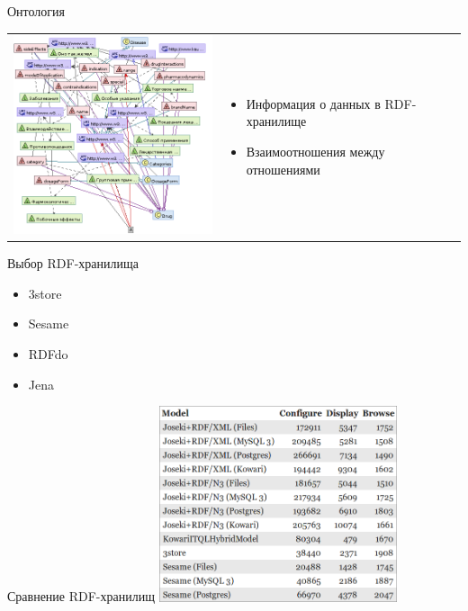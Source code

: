 \documentclass{beamer}
\begin{document}
\begin{frame}[t]{Онтология}

\begin{tabular}{l l}
\begin{minipage}{0.6\textwidth}
\includegraphics[width=70mm]{onto.png}
\end{minipage}
&
\begin{minipage}{0.4\textwidth}
\begin{itemize}
\item Информация о данных в RDF-хранилище
\item Взаимоотношения между отношениями
\end{itemize}
\end{minipage}
\end{tabular}
\end{frame}
\begin{frame}[t]{Выбор RDF-хранилища}
 \begin{itemize}
  \item 3store
  \item Sesame
  \item RDFdo
  \item Jena
 \end{itemize}
\end{frame}
\begin{frame}[t]{Сравнение RDF-хранилищ}
\includegraphics[width=70mm]{storages.png}
\end{frame}
\end{document}
